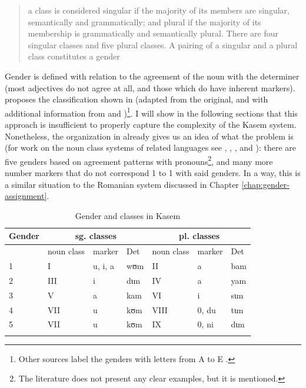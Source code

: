 \begin{quotation}
a class is considered singular if the majority of its members are singular, semantically and grammatically; and plural if the majority of its membership is grammatically and semantically plural. There are four singular classes and five plural classes. A pairing of a singular and a plural class constitutes a gender \autocite[4]{Awedoba.2003}
\end{quotation}

Gender is defined with relation to the agreement of the noun with the determiner (most adjectives do not agree at all, and those which do have inherent markers). \textcite[3]{Awedoba.2003} proposes the  classification shown in  (adapted from the original, and with additional information from \citealt{Awedoba.1980} and \citealt{Awedoba.1996})\footnote{Other sources label the genders with letters from A to E \autocite{Callow.1965}.}. I will show in the following sections that this approach is insufficient to properly capture the complexity of the Kasem system. Nonetheless, the organization in  already gives us an idea of what the problem is (for work on the noun class systems of related languages see \citealt{Brindle.2009}, \citealt{Bodomo.1994}, \citealt{Bodomo.1997}, and \citealt{Dakubu.1997}): there are five genders based on agreement patterns with pronouns\footnote{The literature does not present any clear examples, but it is mentioned.}, and many more number markers that do not correspond 1 to 1 with said genders. In a way, this is a similar situation to the Romanian system discussed in Chapter \ref{chap:gender-assignment}.

\begin{table}[!htb]
  \centering
  \begin{tabular}{lllllll}
    \lsptoprule
    Gender & \multicolumn{3}{c}{sg. classes} & \multicolumn{3}{c}{pl. classes}           \\

    \midrule
      & noun class & marker  & Det & noun class & marker & Det \\
    1 & I          & u, i, a & wʊm & II         & a      & bam \\
    2 & III        & i       & dɩm & IV         & a      & yam \\
    3 & V          & a       & kam & VI         & i      & sɩm \\
    4 & VII        & u       & kʊm & VIII       & 0, du  & tɩm \\
    5 & VII        & u       & kʊm & IX         & 0, ni  & dɩm \\
    \lspbottomrule
  \end{tabular}\caption{Gender and classes in Kasem}\label{tab:gender-class-kasem}
\end{table}

